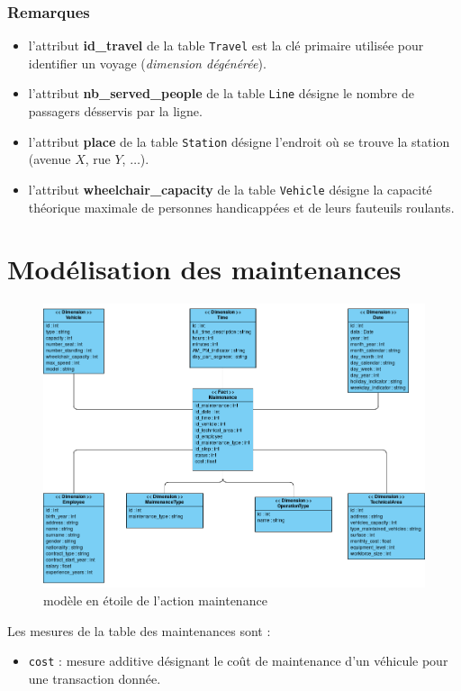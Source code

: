 \documentclass[a4paper,12pt]{report}
\begin{document}
\subsubsection{Remarques}
\begin{itemize}
  \item l'attribut \textbf{id\_travel} de la table \texttt{Travel} est la clé primaire utilisée pour identifier un voyage (\textit{dimension dégénérée}).
  \item l'attribut \textbf{nb\_served\_people} de la table \texttt{Line} désigne le nombre de passagers désservis par la ligne.
  \item l'attribut \textbf{place} de la table \texttt{Station} désigne l'endroit où se trouve la station (avenue $X$, rue $Y$, $\dots$).
  \item l'attribut \textbf{wheelchair\_capacity} de la table \texttt{Vehicle} désigne la capacité théorique maximale de personnes handicappées et de leurs fauteuils roulants.
\end{itemize}

\section{Modélisation des maintenances}
\begin{figure}[!ht]
  \centering
  \includegraphics[scale=0.4]{images/maintenance_datamart.png}
  \caption{modèle en étoile de l'action \og maintenance \fg}
\end{figure}

Les mesures de la table des maintenances sont :
\begin{itemize}
  \item \texttt{cost} : mesure additive désignant le coût de maintenance d'un véhicule pour une transaction donnée.
\end{itemize}
\end{document}
